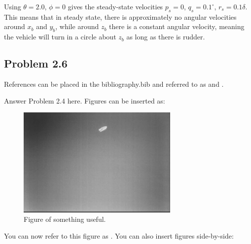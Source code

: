 Using $\theta = 2.0$, $\phi = 0$ gives the steady-state velocities $p_s = 0$, $q_s = 0.1 ^\circ$, $r_s = 0.1 \delta$. This means that in steady state, there is approximately no angular velocities around $x_b$ and $y_b$, while around $z_b$ there is a constant angular velocity, meaning the vehicle will turn in a circle about $z_b$ as long as there is rudder. 

\subsection*{Problem 2.6}


References can be placed in the bibliography.bib and referred to as \cite{Fossen2011} and \cite{Fjellstad1994857}.



Answer Problem 2.4 here. Figures can be inserted as:
\begin{figure}[ht]
	\centering
	\includegraphics[width=0.7\textwidth]{assignment_1/rapport/figures/fig1} 
	\caption{Figure of something useful.}
	\label{fig:fig1}
\end{figure}

You can now refer to this figure as . You can also insert figures side-by-side:
